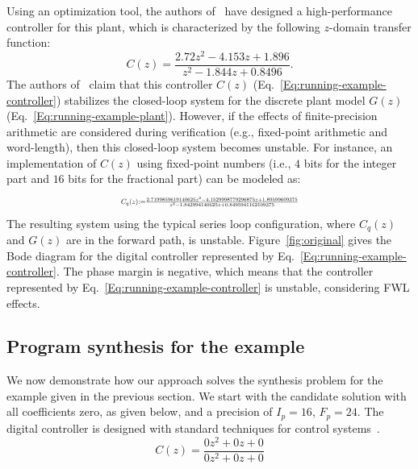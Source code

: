 \documentclass[final]{sig-alternate-05-2015}
\newcommand{\red}[1]{{\color{red}#1}}
\begin{document}
Using an optimization tool, the authors
of~\cite{DBLP:conf/hybrid/WangGRJF16} have designed a high-performance
controller for this plant, which is characterized by the following
$z$-domain transfer function:
%
\begin{equation}
\label{Eq:running-example-controller}
C(z) = \frac{2.72z^2 - 4.153z + 1.896}{z^2 - 1.844z + 0.8496}.
\end{equation}
%
The authors of~\cite{DBLP:conf/hybrid/WangGRJF16} claim that this controller
$C(z)$ (Eq.~\eqref{Eq:running-example-controller}) stabilizes the
closed-loop system for the discrete plant model $G(z)$
(Eq.~\ref{Eq:running-example-plant}).  However, if the effects of
finite-precision arithmetic are considered during verification (e.g.,
fixed-point arithmetic and word-length), then this closed-loop system
becomes unstable.
%
For instance, an implementation of $C(z)$ using  fixed-point
numbers (i.e., $4$ bits for the integer part and $16$ bits for the
fractional part) can be modeled as:
%
\begin{equation}
\label{Eq:running-example-controller-quantized}
\resizebox{.47\textwidth}{!}{
$C_{q}(z) {:=} \frac{2.7199859619140625z^2{-}4.1529998779296875z
{+}1.89599609375}{z^2{-}1.843994140625z+0.8495941162109375}$
}
\end{equation} 
%
The resulting system using the typical series loop configuration, where
$C_{q}(z)$ and $G(z)$ are in the forward path, is unstable. 
Figure~\ref{fig:original} gives the Bode diagram for the digital controller
represented by Eq.~\eqref{Eq:running-example-controller}.  The phase margin
is negative, which means that the controller represented by
Eq.~\eqref{Eq:running-example-controller} is unstable, considering FWL
effects.

\subsection{Program synthesis for the example}
%
We now demonstrate how our approach solves the synthesis problem for the
example given in the previous section.  We start with the candidate solution
with all coefficients zero, as given below, and a precision of $I_p=16$,
$F_p=24$.  The digital controller is designed with standard techniques for
control systems~\cite{Kuo:2002:ACS:579453, Ogata:1987:DCS:26170}.
%
%
$$ C(z)=\frac{0z^2{+}0z{+}0}{0z^2{+}0z{+}0} $$
\end{document}
